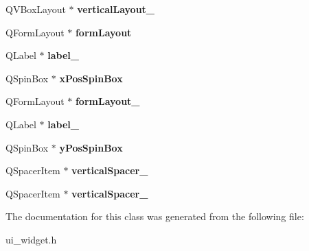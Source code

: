\begin{DoxyCompactItemize}
\mbox{\label{class_ui___widget_a94d824e35816b8321eabf0aa3ae12205}} 
Q\+V\+Box\+Layout $\ast$ {\bfseries vertical\+Layout\+\_}
\item 
\mbox{\label{class_ui___widget_a537ca1b71514197c43c46c53a0cf17b2}} 
Q\+Form\+Layout $\ast$ {\bfseries form\+Layout}
\item 
\mbox{\label{class_ui___widget_adfcab5569ac08da197e14dba01390755}} 
Q\+Label $\ast$ {\bfseries label\+\_}
\item 
\mbox{\label{class_ui___widget_ac6eb8a33e2240853a57c96e6ec709669}} 
Q\+Spin\+Box $\ast$ {\bfseries x\+Pos\+Spin\+Box}
\item 
\mbox{\label{class_ui___widget_ab44e0730337d3efc0acddd71f77d7c93}} 
Q\+Form\+Layout $\ast$ {\bfseries form\+Layout\+\_}
\item 
\mbox{\label{class_ui___widget_a7d22bf9c5cf51754b1c145db5ca0da79}} 
Q\+Label $\ast$ {\bfseries label\+\_}
\item 
\mbox{\label{class_ui___widget_acac1ed06d6b9ed050e98c38df9114397}} 
Q\+Spin\+Box $\ast$ {\bfseries y\+Pos\+Spin\+Box}
\item 
\mbox{\label{class_ui___widget_a7bbc69ea172e9f2112a1bbc7ed965fff}} 
Q\+Spacer\+Item $\ast$ {\bfseries vertical\+Spacer\+\_}
\item 
\mbox{\label{class_ui___widget_aae602c37f1a92e5e2ed2bfa7f097acc8}} 
Q\+Spacer\+Item $\ast$ {\bfseries vertical\+Spacer\+\_}
\end{DoxyCompactItemize}


The documentation for this class was generated from the following file\+:\begin{DoxyCompactItemize}
\item 
ui\+\_\+widget.\+h\end{DoxyCompactItemize}
